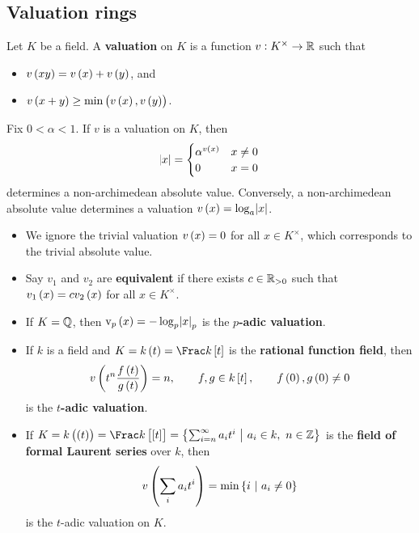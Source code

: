 \subsection{Valuation rings}

\begin{definition}
Let $ K $ be a field. A \textbf{valuation} on $ K $ is a function $ v : K^\times \to \mathbb{R} $ such that
\begin{itemize}
\item $ v\br{xy} = v\br{x} + v\br{y} $, and
\item $ v\br{x + y} \ge \min\br{v\br{x}, v\br{y}} $.
\end{itemize}
\end{definition}

Fix $ 0 < \alpha < 1 $. If $ v $ is a valuation on $ K $, then
$$ \abs{x} =
\begin{cases}
\alpha^{v\br{x}} & x \ne 0 \\
0 & x = 0
\end{cases}
$$
determines a non-archimedean absolute value. Conversely, a non-archimedean absolute value determines a valuation $ v\br{x} = \log_a \abs{x} $.

\begin{remark*}
\hfill
\begin{itemize}
\item We ignore the trivial valuation $ v\br{x} = 0 $ for all $ x \in K^\times $, which corresponds to the trivial absolute value.
\item Say $ v_1 $ and $ v_2 $ are \textbf{equivalent} if there exists $ c \in \mathbb{R}_{> 0} $ such that $ v_1\br{x} = cv_2\br{x} $ for all $ x \in K^\times $.
\end{itemize}
\end{remark*}

\pagebreak

\begin{example*}
\hfill
\begin{itemize}
\item If $ K = \mathbb{Q} $, then $ \v_p\br{x} = -\log_p \abs{x}_p $ is the \textbf{$ p $-adic valuation}.
\item If $ k $ is a field and $ K = k\br{t} = \Frac k\sbr{t} $ is the \textbf{rational function field}, then
$$ v\br{t^n\dfrac{f\br{t}}{g\br{t}}} = n, \qquad f, g \in k\sbr{t}, \qquad f\br{0}, g\br{0} \ne 0 $$
is the \textbf{$ t $-adic valuation}.
\item If $ K = k\br{\br{t}} = \Frac k\sbr{\sbr{t}} = \cbr{\sum_{i = n}^\infty a_it^i \st a_i \in k, \ n \in \ZZ} $ is the \textbf{field of formal Laurent series} over $ k $, then
$$ v\br{\sum_i a_it^i} = \min \cbr{i \st a_i \ne 0} $$
is the $ t $-adic valuation on $ K $.
\end{itemize}
\end{example*}

